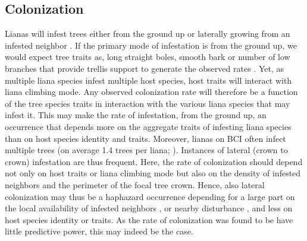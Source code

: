 \documentclass[b5paper,justified]{tufte-book} %
\begin{document}
\begin{fullwidth}
\subsection{Colonization}
Lianas will infest trees either from the ground up or laterally growing from an infested neighbor \citep[e.g.][]{Heijden2008}. If the primary mode of infestation is from the ground up, we would expect tree traits as, long straight boles, smooth bark or number of low branches that provide trellis support to generate the observed rates \citep{Putz1984,Putz1984a}.  Yet, as multiple liana species infest multiple host species, host traits will interact with liana climbing mode. Any observed colonization rate will therefore be a function of the tree species traits in interaction with the various liana species that may infest it. This may make the rate of infestation, from the ground up, an occurrence that depends more on the aggregate traits of infesting liana species than on host species identity and traits. Moreover, lianas on BCI often infect multiple trees (on average 1.4 trees per liana; \citealt{Putz1984a}). Instances of lateral (crown to crown) infestation are thus frequent. Here, the rate of colonization should depend not only on host traits or liana climbing mode but also on the density of infested neighbors and the perimeter of the focal tree crown. Hence, also lateral colonization may thus be a haphazard occurrence depending for a large part on the local availability of infested neighbors \citep{Heijden2008}, or nearby disturbance \citep{Ledo2014}, and less on host species identity or traits. As the rate of colonization was found to be have little predictive power, this may indeed be the case.
 

\end{fullwidth}
\end{document}
